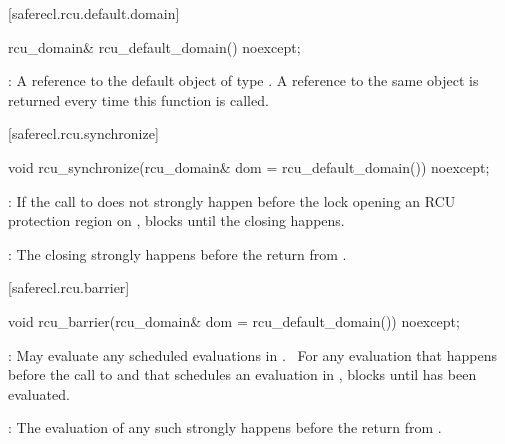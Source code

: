 [saferecl.rcu.default.domain]{}

\begin{itemdecl}
rcu_domain& rcu_default_domain() noexcept;
\end{itemdecl}

\begin{itemdescr}

\pnum
{}: A reference to the default object of type .
A reference to the same object is returned every time this
function is called.

\end{itemdescr}

[saferecl.rcu.synchronize]{}

\begin{itemdecl}
void rcu_synchronize(rcu_domain& dom = rcu_default_domain()) noexcept;
\end{itemdecl}

\begin{itemdescr}

\pnum
{}: If the call to  does not strongly
happen before the lock opening an RCU protection region 
on , blocks until the  closing 
happens.

\pnum
{}: The  closing  strongly
happens before the return from .

\end{itemdescr}

[saferecl.rcu.barrier]{}

\begin{itemdecl}
void rcu_barrier(rcu_domain& dom = rcu_default_domain()) noexcept;
\end{itemdecl}

\begin{itemdescr}

\pnum
{}: May evaluate any scheduled evaluations in
.  For any evaluation that happens before the call
to  and that schedules an evaluation 
in , blocks until  has been evaluated.  

\pnum
{}: The evaluation of any such  strongly
happens before the return from .

\end{itemdescr}

